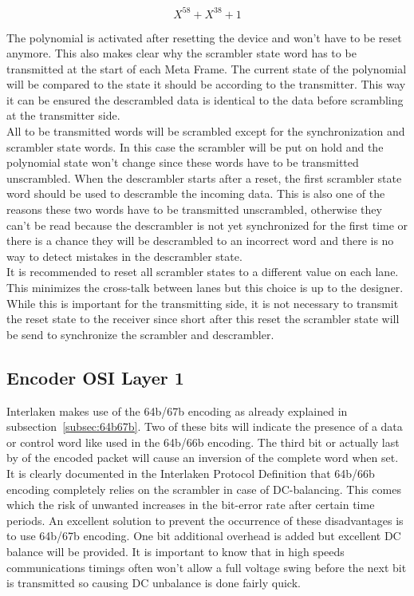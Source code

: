 	\begin{displaymath}
	X^{58}+X^{38}+1
	\end{displaymath}
	
	The polynomial is activated after resetting the device and won't have to be reset anymore. This also makes clear why the scrambler state word has to be transmitted at the start of each Meta Frame. The current state of the polynomial will be compared to the state it should be according to the transmitter. This way it can be ensured the descrambled data is identical to the data before scrambling at the transmitter side. \\
	
	All to be transmitted words will be scrambled except for the synchronization and scrambler state words. In this case the scrambler will be put on hold and the polynomial state won't change since these words have to be transmitted unscrambled. When the descrambler starts after a reset, the first scrambler state word should be used to descramble the incoming data. This is also one of the reasons these two words have to be transmitted unscrambled, otherwise they can't be read because the descrambler is not yet synchronized for the first time or there is a chance they will be descrambled to an incorrect word and there is no way to detect mistakes in the descrambler state. \\
	
	It is recommended to reset all scrambler states to a different value on each lane. This minimizes the cross-talk between lanes but this choice is up to the designer. While this is important for the transmitting side, it is not necessary to transmit the reset state to the receiver since short after this reset the scrambler state will be send to synchronize the scrambler and descrambler.
\newpage


\subsection[Encoder]{Encoder \hfill OSI Layer 1}
	Interlaken makes use of the 64b/67b encoding as already explained in subsection~\ref{subsec:64b67b}. Two of these bits will indicate the presence of a data or control word like used in the 64b/66b encoding. The third bit or actually last by of the encoded packet will cause an inversion of the complete word when set. It is clearly documented in the Interlaken Protocol Definition that 64b/66b encoding completely relies on the scrambler in case of DC-balancing. This comes which the risk of unwanted increases in the bit-error rate after certain time periods. An excellent solution to prevent the occurrence of these disadvantages is to use 64b/67b encoding. One bit additional overhead is added but excellent DC balance will be provided. It is important to know that in high speeds communications timings often won't allow a full voltage swing before the next bit is transmitted so causing DC unbalance is done fairly quick.\\
	
